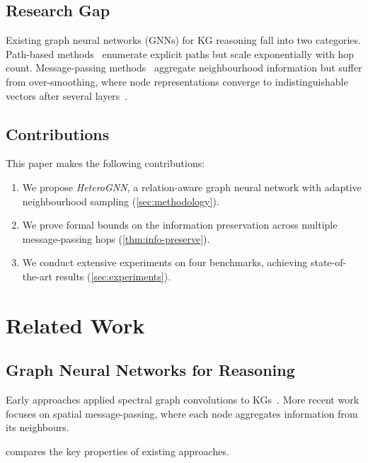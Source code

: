 \documentclass[
    language=english,
    doctype=article,
    institution=none,
]{../../omnilatex}
\theoremstyle{definition}
\theoremstyle{definition}
\theoremstyle{remark}
\begin{document}
\subsection{Research Gap}

Existing graph neural networks (GNNs) for KG reasoning fall into two
categories.  Path-based methods~\cite{mollenhauerHandbuchDieselmotoren2007}
enumerate explicit paths but scale exponentially with hop count.
Message-passing methods~\cite{ramalhoFluentPython2015} aggregate
neighbourhood information but suffer from over-smoothing, where node
representations converge to indistinguishable vectors after several
layers~\cite{baehrThermodynamikGrundlagenUnd2016}.

\subsection{Contributions}

This paper makes the following contributions:
\begin{enumerate}
    \item We propose \emph{HeteroGNN}, a relation-aware graph neural
          network with adaptive neighbourhood sampling
          (\cref{sec:methodology}).
    \item We prove formal bounds on the information preservation across
          multiple message-passing hops (\cref{thm:info-preserve}).
    \item We conduct extensive experiments on four benchmarks, achieving
          state-of-the-art results (\cref{sec:experiments}).
\end{enumerate}

\section{Related Work}
\label{sec:related}

\subsection{Graph Neural Networks for Reasoning}

Early approaches applied spectral graph convolutions to
KGs~\cite{diracPrinciplesQuantumMechanics1981}.  More recent work
focuses on spatial message-passing, where each node aggregates
information from its neighbours.

 compares the key properties of existing approaches.
\end{document}
